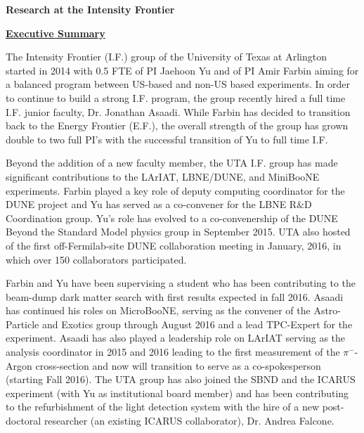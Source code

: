 \begin{center}
\LARGE\textbf{Research at the Intensity Frontier}
\end{center}

\begin{center}
\textbf{\underline{Executive Summary} }
\end{center}

The Intensity Frontier (I.F.) group of the University of Texas at Arlington started in 2014 with 0.5 FTE of PI Jaehoon Yu and of PI Amir Farbin aiming for a balanced program between US-based and non-US based experiments. In order to continue to build a strong I.F. program, the group recently hired a full time I.F. junior faculty, Dr. Jonathan Asaadi. While Farbin has decided to transition back to the Energy Frontier (E.F.), the overall strength of the group has grown double to two full PI's with the successful transition of Yu to full time I.F.

Beyond the addition of a new faculty member, the UTA I.F. group has made significant contributions to the LArIAT, LBNE/DUNE, and MiniBooNE experiments. Farbin played a key role of deputy computing coordinator for the DUNE project and Yu has served as a co-convener for the LBNE R$\&$D Coordination group. Yu's role has evolved to a co-convenership of the DUNE Beyond the Standard Model physics group in September 2015. UTA also hosted of the first off-Fermilab-site DUNE collaboration meeting in January, 2016, in which over 150 collaborators participated. 

Farbin and Yu have been supervising a student who has been contributing to the beam-dump dark matter search with first results expected in fall 2016. Asaadi has continued his roles on MicroBooNE, serving as the convener of the Astro-Particle and Exotics group through August 2016 and a lead TPC-Expert for the experiment. Asaadi has also played a leadership role on LArIAT serving as the analysis coordinator in 2015 and 2016 leading to the first measurement of the $\pi^{-}$-Argon cross-section and now will transition to serve as a co-spokesperson (starting Fall 2016). The UTA group has also joined the SBND and the ICARUS experiment (with Yu as institutional board member) and has been contributing to the refurbishment of the light detection system with the hire of a new post-doctoral researcher (an existing ICARUS collaborator), Dr. Andrea Falcone.

